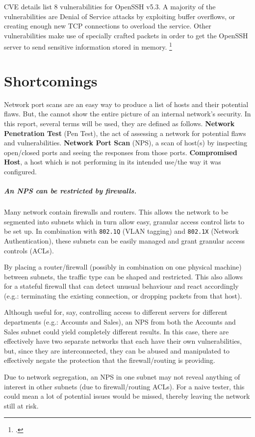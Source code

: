 \documentclass[a4paper]{article}
\begin{document}
CVE details list 8 vulnerabilities for OpenSSH v5.3.
A majority of the vulnerabilities are Denial of Service attacks by exploiting buffer overflows, or creating enough new TCP connections to overload the service.
Other vulnerabilities make use of specially crafted packets in order to get the OpenSSH server to send sensitive information stored in memory.
\footcite{cve_openssh}

\newpage
\section{Shortcomings}
Network port scans are an easy way to produce a list of hosts and their potential flaws.
But, the cannot show the entire picture of an internal network's security.
In this report, several terms will be used, they are defined as follows.
\textbf{Network Penetration Test} (Pen Test), the act of assessing a network for potential flaws and vulnerabilities.
\textbf{Network Port Scan} (NPS), a scan of host(s) by inspecting open/closed ports and seeing the responses from those ports.
\textbf{Compromised Host}, a host which is not performing in its intended use/the way it was configured.


\subparagraph{An NPS can be restricted by firewalls.}
Many network contain firewalls and routers.
This allows the network to be segmented into subnets which in turn allow easy, granular access control lists to be set up.
In combination with \texttt{802.1Q} (VLAN tagging) and \texttt{802.1X} (Network Authentication), these subnets can be easily managed and grant granular access controls (ACLs).

By placing a router/firewall (possibly in combination on one physical machine) between subnets, the traffic type can be shaped and restricted.
This also allows for a stateful firewall that can detect unusual behaviour and react accordingly (e.g.: terminating the existing connection, or dropping packets from that host).

Although useful for, say, controlling access to different servers for different departments (e.g.: Accounts and Sales), an NPS from both the Accounts and Sales subnet could yield completely different results.
In this case, there are effectively have two separate networks that each have their own vulnerabilities, but, since they are interconnected, they can be abused and manipulated to effectively negate the protection that the firewall/routing is providing.

Due to network segregation, an NPS in one subnet may not reveal anything of interest in other subnets (due to firewall/routing ACLs).
For a naive tester, this could mean a lot of potential issues would be missed, thereby leaving the network still at risk.
\end{document}
